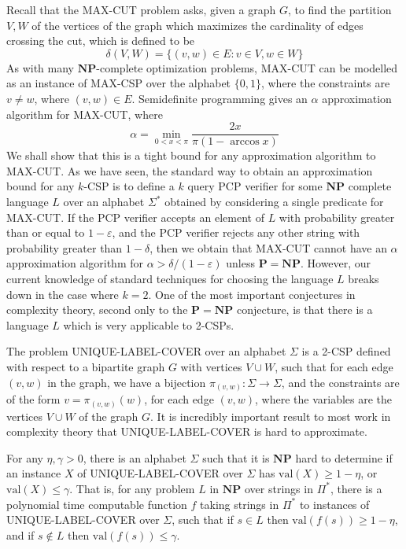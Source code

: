 Recall that the MAX-CUT problem asks, given a graph $G$, to find the partition $V, W$ of the vertices of the graph which maximizes the cardinality of edges crossing the cut, which is defined to be
%
\[ \delta(V, W) = \{ (v, w) \in E: v \in V, w \in W \} \]
%
As with many $\mathbf{NP}$-complete optimization problems, MAX-CUT can be modelled as an instance of MAX-CSP over the alphabet $\{ 0, 1 \}$, where the constraints are $v \neq w$, where $(v,w) \in E$. Semidefinite programming gives an $\alpha$ approximation algorithm for MAX-CUT, where
%
\[ \alpha = \min_{0 < x < \pi} \frac{2x}{\pi (1 - \arccos x)} \]
%
We shall show that this is a tight bound for any approximation algorithm to MAX-CUT. As we have seen, the standard way to obtain an approximation bound for any $k$-CSP is to define a $k$ query PCP verifier for some $\mathbf{NP}$ complete language $L$ over an alphabet $\Sigma^*$ obtained by considering a single predicate for MAX-CUT. If the PCP verifier accepts an element of $L$ with probability greater than or equal to $1 - \varepsilon$, and the PCP verifier rejects any other string with probability greater than $1 - \delta$, then we obtain that MAX-CUT cannot have an $\alpha$ approximation algorithm for $\alpha > \delta/(1 - \varepsilon)$ unless $\mathbf{P} = \mathbf{NP}$. However, our current knowledge of standard techniques for choosing the language $L$ breaks down in the case where $k = 2$. One of the most important conjectures in complexity theory, second only to the $\mathbf{P} = \mathbf{NP}$ conjecture, is that there is a language $L$ which is very applicable to 2-CSPs.

The problem UNIQUE-LABEL-COVER over an alphabet $\Sigma$ is a 2-CSP defined with respect to a bipartite graph $G$ with vertices $V \cup W$, such that for each edge $(v,w)$ in the graph, we have a bijection $\pi_{(v,w)}: \Sigma \to \Sigma$, and the constraints are of the form $v = \pi_{(v,w)}(w)$, for each edge $(v,w)$, where the variables are the vertices $V \cup W$ of the graph $G$. It is incredibly important result to most work in complexity theory that UNIQUE-LABEL-COVER is hard to approximate.

\begin{theorem}
    For any $\eta, \gamma > 0$, there is an alphabet $\Sigma$ such that it is $\mathbf{NP}$ hard to determine if an instance $X$ of UNIQUE-LABEL-COVER over $\Sigma$ has $\text{val}(X) \geq 1 - \eta$, or $\text{val}(X) \leq \gamma$. That is, for any problem $L$ in $\mathbf{NP}$ over strings in $\Pi^*$, there is a polynomial time computable function $f$ taking strings in $\Pi^*$ to instances of UNIQUE-LABEL-COVER over $\Sigma$, such that if $s \in L$ then $\text{val}(f(s)) \geq 1 - \eta$, and if $s \not \in L$ then $\text{val}(f(s)) \leq \gamma$.
\end{theorem}

